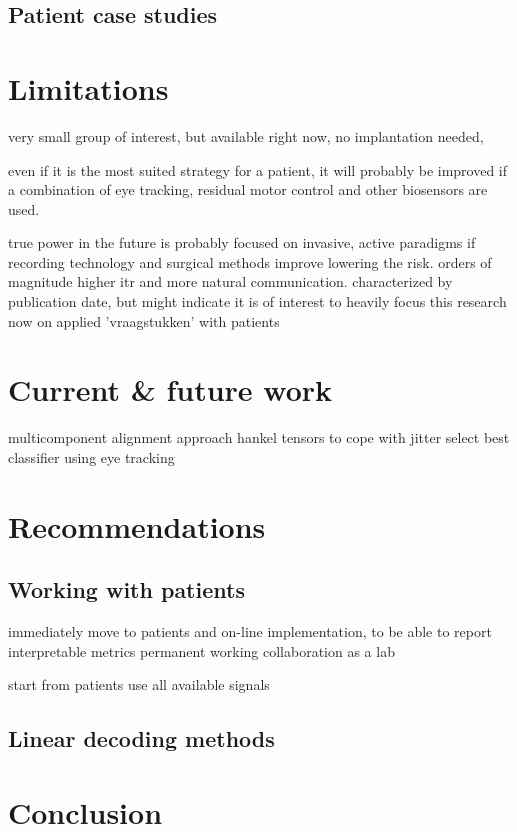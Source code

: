 
\subsection{Patient case studies}

\section{Limitations}

very small group of interest, but available right now, no implantation needed,

even if it is the most suited strategy for a patient, it will probably be
improved if a combination of eye tracking, residual motor control and other
biosensors are used.

true power in the future is probably focused on
invasive, active paradigms if recording technology and surgical methods
improve lowering the risk. orders of magnitude higher itr and more natural
communication.
characterized by publication date, but might indicate it is of interest to
heavily focus this research now on applied 'vraagstukken' with patients

\section{Current \& future work}
multicomponent alignment approach
hankel tensors to cope with jitter
select best classifier using eye tracking

\section{Recommendations}
\subsection{Working with patients}
immediately move to patients and on-line implementation, to be able to report
interpretable metrics
permanent working collaboration as a lab

start from patients
use all available signals
\subsection{Linear decoding methods}

\section{Conclusion}
